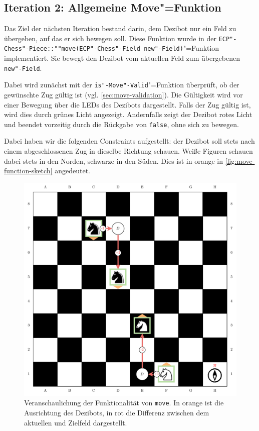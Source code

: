 \subsection{Iteration 2: Allgemeine Move"=Funktion}
\label{sec:general-move-function}

Das Ziel der nächsten Iteration bestand darin, dem Dezibot nur ein Feld zu übergeben, auf das er sich bewegen soll. Diese Funktion wurde in der \texttt{ECP"-Chess"-Piece::""move(ECP"-Chess"-Field new"-Field)}"=Funktion implementiert. Sie bewegt den Dezibot vom aktuellen Feld zum übergebenen \texttt{new"-Field}.

Dabei wird zunächst mit der \texttt{is"-Move"-Valid}"=Funktion überprüft, ob der gewünschte Zug gültig ist (vgl. \autoref{sec:move-validation}). Die Gültigkeit wird vor einer Bewegung über die LEDs des Dezibots dargestellt. Falls der Zug gültig ist, wird dies durch grünes Licht angezeigt. Andernfalls zeigt der Dezibot rotes Licht und beendet vorzeitig durch die Rückgabe von \texttt{false}, ohne sich zu bewegen.


Dabei haben wir die folgenden Constraints aufgestellt: der Dezibot soll stets nach einem abgeschlossenen Zug in dieselbe Richtung schauen. Weiße Figuren schauen dabei stets in den Norden, schwarze in den Süden. Dies ist in orange in \autoref{fig:move-function-sketch} angedeutet.

\begin{figure}[h]
    \includegraphics[width=\textwidth]{../assets/move_function_sketch.drawio.pdf}
    \caption{Veranschaulichung der Funktionalität von \texttt{move}. In orange ist die Ausrichtung des Dezibots, in rot die Differenz zwischen dem aktuellen und Zielfeld dargestellt.}
    \label{fig:move-function-sketch}
\end{figure}

